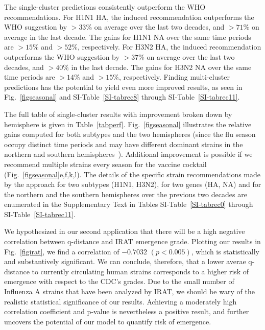 \documentclass[onecolumn, compsoc,10pt]{IEEEtran}
\newif\ifFIGS
\begin{document}
\ifFIGS
\begin{table}[!ht]\centering
\captionN{Out-performance of \qnet recommendations over WHO 
for Influenza A vaccine composition}\label{tabperf}\centering

\sffamily\fontsize{9}{9}\selectfont


\end{table}
\else
{}\label{tabperf}
\fi

The \qnet single-cluster predictions consistently outperform the WHO recommendations. For H1N1 HA, the \qnet induced recommendation outperforms the WHO suggestion by $>33\%$ on average over the last two decades, and $>71\%$ on average in the last decade. The gains for H1N1 NA over the same time periods are $>15\%$ and $>52\%$, respectively. For H3N2 HA, the \qnet induced recommendation outperforms the WHO suggestion by $>37\%$ on average over the last two decades, and $>40\%$ in the last decade. The gains for H3N2 NA over the same time periods are $>14\%$ and $>15\%$, respectively. Finding multi-cluster predictions has the potential to yield even more improved results, as seen in Fig.~\ref{figseasonal} and SI-Table~\ref{SI-tabrec8} through SI-Table~\ref{SI-tabrec11}.

The full table of single-cluster results with improvement broken down by hemisphere is given in Table~\ref{tabperf}. Fig.~\ref{figseasonal} illustrates the relative gains computed for both subtypes and the two hemispheres (since the flu season occupy distinct time periods and may have different dominant strains in the northern and southern hemispheres~\cite{boni2008vaccination}). Additional improvement is possible if we recommend multiple strains every season for the vaccine cocktail (Fig.~\ref{figseasonal}e,f,k,l). The details of the specific strain  recommendations made by the \qnet approach for two subtypes (H1N1, H3N2), for two genes (HA, NA) and for the northern and the southern hemispheres over the previous two decades are enumerated in the Supplementary Text in Tables SI-Table~\ref{SI-tabrec0} through SI-Table~\ref{SI-tabrec11}.

We hypothesized in our second application that there will be a high negative correlation between q-distance and IRAT emergence grade. Plotting our results in Fig.~\ref{figirat}, we find a correlation of $-0.7032$ $(p < 0.005)$, which is statistically and substantively significant. We can conclude, therefore, that a lower averae q-distance to currently circulating human strains corresponds to a higher risk of emergence with respect to the CDC's grades. Due to the small number of Influenza A strains that have been analyzed by IRAT, we should be wary of the realistic statistical significance of our results. Achieving a moderately high correlation coefficient and p-value is nevertheless a positive result, and further uncovers the potential of our model to quantify risk of emergence. 
\end{document}
